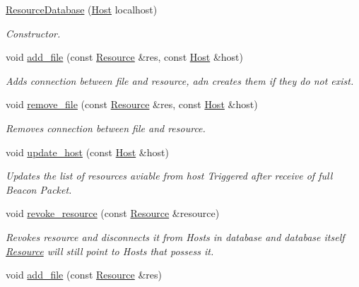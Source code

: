\begin{DoxyCompactItemize}
\item 
\hyperlink{classsimpleP2P_1_1ResourceDatabase_a6fb45392300235160204e9666267eb51}{Resource\+Database} (\hyperlink{classsimpleP2P_1_1Host}{Host} localhost)
\begin{DoxyCompactList}\small\item\em Constructor. \end{DoxyCompactList}\item 
void \hyperlink{classsimpleP2P_1_1ResourceDatabase_aa2d77490749129d0b8cd2b5abe9aec68}{add\+\_\+file} (const \hyperlink{classsimpleP2P_1_1Resource}{Resource} \&res, const \hyperlink{classsimpleP2P_1_1Host}{Host} \&host)
\begin{DoxyCompactList}\small\item\em Adds connection between file and resource, adn creates them if they do not exist. \end{DoxyCompactList}\item 
void \hyperlink{classsimpleP2P_1_1ResourceDatabase_a3ea481ae3b35f9c93e55595a38d8bec4}{remove\+\_\+file} (const \hyperlink{classsimpleP2P_1_1Resource}{Resource} \&res, const \hyperlink{classsimpleP2P_1_1Host}{Host} \&host)
\begin{DoxyCompactList}\small\item\em Removes connection between file and resource. \end{DoxyCompactList}\item 
void \hyperlink{classsimpleP2P_1_1ResourceDatabase_a702f98ada572961ce3665bded3b20903}{update\+\_\+host} (const \hyperlink{classsimpleP2P_1_1Host}{Host} \&host)
\begin{DoxyCompactList}\small\item\em Updates the list of resources aviable from host Triggered after receive of full Beacon Packet. \end{DoxyCompactList}\item 
void \hyperlink{classsimpleP2P_1_1ResourceDatabase_a266b2d64276b46153257b1d798860682}{revoke\+\_\+resource} (const \hyperlink{classsimpleP2P_1_1Resource}{Resource} \&resource)
\begin{DoxyCompactList}\small\item\em Revokes resource and disconnects it from Hosts in database and database itself \hyperlink{classsimpleP2P_1_1Resource}{Resource} will still point to Hosts that possess it. \end{DoxyCompactList}\item 
void \hyperlink{classsimpleP2P_1_1ResourceDatabase_a837b7ec01d60df86d1f6b66350f7c78b}{add\+\_\+file} (const \hyperlink{classsimpleP2P_1_1Resource}{Resource} \&res)

\end{DoxyCompactItemize}
